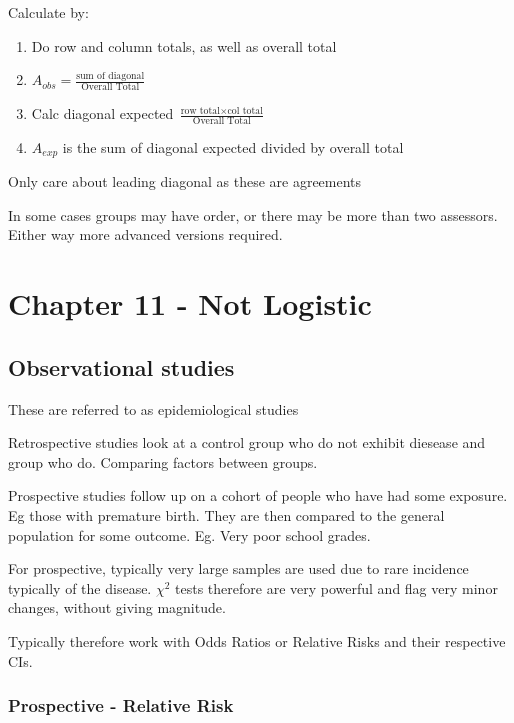 \documentclass[
  letterpaper,
  DIV=11,
  numbers=noendperiod]{scrreprt}
\providecommand{\tightlist}{%
  \setlength{\itemsep}{0pt}\setlength{\parskip}{0pt}}\usepackage{longtable,booktabs,array}
\begin{document}
Calculate by:

\begin{enumerate}
\def\labelenumi{\arabic{enumi})}
\tightlist
\item
  Do row and column totals, as well as overall total
\item
  \(A_{obs} = \frac{\text{sum of diagonal}}{\text{Overall Total}}\)
\item
  Calc diagonal expected
  \(\frac{\text{row total}\times \text{col total}}{\text{Overall Total}}\)
\item
  \(A_{exp}\) is the sum of diagonal expected divided by overall total
\end{enumerate}

Only care about leading diagonal as these are agreements

In some cases groups may have order, or there may be more than two
assessors. Either way more advanced versions required.


\hypertarget{chapter-11---not-logistic}{%
\chapter{Chapter 11 - Not Logistic}\label{chapter-11---not-logistic}}

\hypertarget{observational-studies}{%
\section{Observational studies}\label{observational-studies}}

These are referred to as epidemiological studies

Retrospective studies look at a control group who do not exhibit
diesease and group who do. Comparing factors between groups.

Prospective studies follow up on a cohort of people who have had some
exposure. Eg those with premature birth. They are then compared to the
general population for some outcome. Eg. Very poor school grades.

For prospective, typically very large samples are used due to rare
incidence typically of the disease. \(\chi^2\) tests therefore are very
powerful and flag very minor changes, without giving magnitude.

Typically therefore work with Odds Ratios or Relative Risks and their
respective CIs.

\hypertarget{prospective---relative-risk}{%
\subsection{Prospective - Relative
Risk}\label{prospective---relative-risk}}
\end{document}
